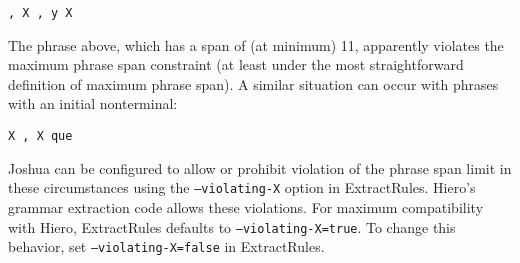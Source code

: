 \begin{verbatim}
, X , y X
\end{verbatim}

The phrase above, which has a span of (at minimum) 11, apparently violates the maximum phrase span constraint (at least under the most straightforward definition of maximum phrase span). A similar situation can occur with phrases with an initial nonterminal:

\begin{verbatim}
X , X que
\end{verbatim}

Joshua can be configured to allow or prohibit violation of the phrase span limit in these circumstances using the {\tt --violating-X} option in ExtractRules. Hiero's grammar extraction code allows these violations. For maximum compatibility with Hiero, ExtractRules defaults to {\tt --violating-X=true}. To change this behavior, set {\tt --violating-X=false} in ExtractRules.

